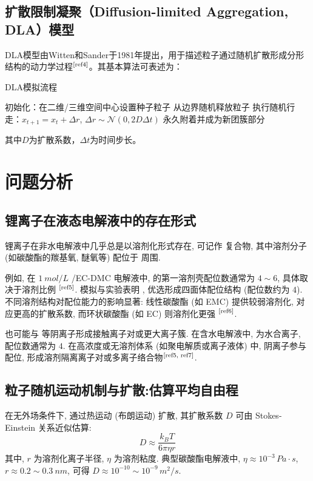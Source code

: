 \documentclass{article}
\begin{document}
\subsection{扩散限制凝聚（Diffusion-limited Aggregation, DLA）模型}
DLA模型由Witten和Sander于1981年提出，用于描述粒子通过随机扩散形成分形结构的动力学过程$^{\textup{\cite{ref4}}}$。其基本算法可表述为：
\begin{algorithm}[H]
\caption{DLA模拟流程}
\begin{algorithmic}[1]
\STATE 初始化：在二维/三维空间中心设置种子粒子
    \STATE 从边界随机释放粒子
        \STATE 执行随机行走：$x_{t+1} = x_t + \Delta r$, $\Delta r \sim \mathcal{N}(0,2D\Delta t)$
            \STATE 永久附着并成为新团簇部分
        \ENDIF
    \ENDWHILE
\ENDFOR
\end{algorithmic}
\end{algorithm}

其中$D$为扩散系数，$\Delta t$为时间步长。\\


\section{问题分析}
\subsection{锂离子在液态电解液中的存在形式}
		锂离子在非水电解液中几乎总是以溶剂化形式存在, 可记作  复合物, 其中溶剂分子 (如碳酸酯的羰基氧, 醚氧等) 配位于  周围.

		例如, 在 $\SI{1}{mol/L}$  /EC-DMC 电解液中,  的第一溶剂壳配位数通常为 $4 \sim 6$, 具体取决于溶剂比例 $^\textup{\cite{ref5}}$. 模拟与实验表明 , 优选形成四面体配位结构 (配位数约为 $4$). 不同溶剂结构对配位能力的影响显著: 线性碳酸酯 (如 EMC) 提供较弱溶剂化, 对应更高的扩散系数, 而环状碳酸酯 (如 EC) 则溶剂化更强 $^\textup{\cite{ref6}}$.

		 也可能与  等阴离子形成接触离子对或更大离子簇. 在含水电解液中,  为水合离子, 配位数通常为 $4$. 在高浓度或无溶剂体系 (如聚电解质或离子液体) 中, 阴离子参与配位, 形成溶剂隔离离子对或多离子络合物$^\textup{\cite{ref5, ref7}}$.

	\subsection{粒子随机运动机制与扩散:估算平均自由程}
		在无外场条件下,  通过热运动 (布朗运动) 扩散, 其扩散系数 $D$ 可由 Stokes-Einstein 关系近似估算:
		\begin{equation}
		D \approx \frac{k_{B} T}{6 \pi \eta r}
		\end{equation}
		其中, $r$ 为溶剂化离子半径, $\eta$ 为溶剂粘度. 典型碳酸酯电解液中, $\eta \approx 10^{-3}\,\si{Pa\cdot s}$, $r \approx 0.2 \sim \SI{0.3}{nm}$, 可得 $D \approx 10^{-10} \sim 10^{-9}\,\si{m^{2}/s}$.
\end{document}
